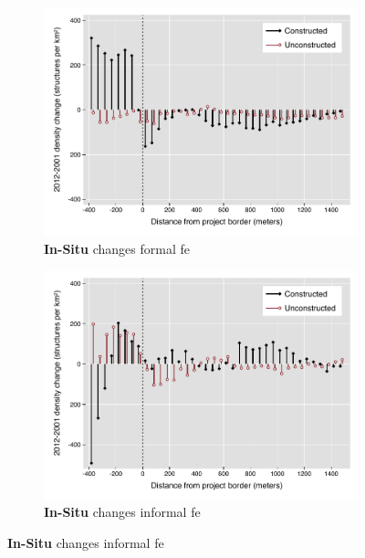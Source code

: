 \documentclass[12pt]{article}
\begin{document}
\begin{figure}
\begin{subfigure}[b]{0.48\textwidth}
        \end{subfigure}
        \begin{subfigure}[b]{0.48\textwidth}
                    \caption[Network2]%
            {{\footnotesize \textbf{In-Situ} changes formal fe}}   
            \label{fig:prefor}
            \centering
            \includegraphics[width=\textwidth,trim={0.3cm .3cm 0.1cm 0cm}, clip=true]{figures/bblu_for_fe_rawchanges_4_2_sp_postk.pdf}

        \end{subfigure}
        \hfill
        \begin{subfigure}[b]{0.48\textwidth}  
                    \caption[]%
            {{\footnotesize \textbf{In-Situ} changes informal fe}}     
            \label{fig:preinf}
            \centering 
            \includegraphics[width=\textwidth,trim={0.3cm .3cm 0.1cm 0cm}, clip=true]{figures/bblu_inf_fe_rawchanges_4_2_sp_postk.pdf}


\end{subfigure}
\end{figure}
\end{document}
